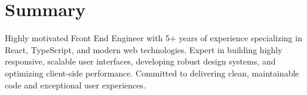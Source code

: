 \section{Summary}
Highly motivated Front End Engineer with 5+ years of experience specializing in React, TypeScript, and modern web technologies. Expert in building highly responsive, scalable user interfaces, developing robust design systems, and optimizing client-side performance. Committed to delivering clean, maintainable code and exceptional user experiences.
